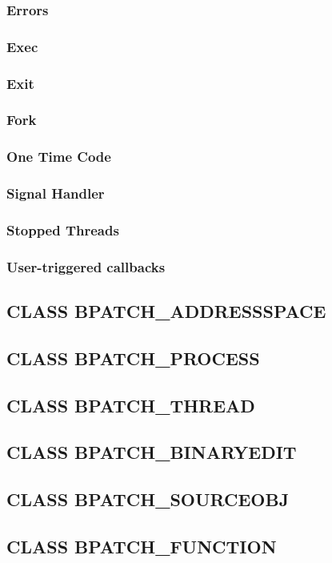 \documentclass[twopages,a4paper]{article}
\begin{document}
\subsubsection{Errors}
\subsubsection{Exec}
\subsubsection{Exit}
\subsubsection{Fork}
\subsubsection{One Time Code}
\subsubsection{Signal Handler}
\subsubsection{Stopped Threads}
\subsubsection{User-triggered callbacks}
\subsection{CLASS BPATCH\_ADDRESSSPACE}
\subsection{CLASS BPATCH\_PROCESS}
\subsection{CLASS BPATCH\_THREAD}
\subsection{CLASS BPATCH\_BINARYEDIT}
\subsection{CLASS BPATCH\_SOURCEOBJ}
\subsection{CLASS BPATCH\_FUNCTION}
\end{document}
